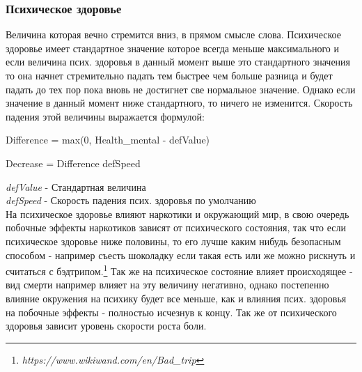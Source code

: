 \documentclass[11pt]{report}
\begin{document}
\subsubsection{Психическое здоровье}
Величина которая вечно стремится вниз, в прямом смысле слова. Психическое здоровье имеет стандартное значение которое всегда меньше максимального и если величина псих. здоровья в данный момент выше это стандартного значения то она начнет стремительно падать тем быстрее чем больше разница и будет падать до тех пор пока вновь не достигнет све нормальное значение. Однако если значение в данный момент ниже стандартного, то ничего не изменится. Скорость падения этой величины выражается формулой: 
\begin{myequation}
	Difference = max\left(0, Health_{mental} - defValue\right)
\end{myequation}
\begin{myequation}
	Decrease = Difference \cdot defSpeed
\end{myequation}
\textit{defValue} - Стандартная величина\\
\textit{defSpeed} - Скорость падения псих. здоровья по умолчанию\\

На психическое здоровье влияют наркотики и окружающий мир, в свою очередь побочные эффекты наркотиков зависят от психического состояния, так что если психическое здоровье ниже половины, то его лучше  каким нибудь безопасным способом - например съесть шоколадку если такая есть или же можно рискнуть и считаться с бэдтрипом.\footnote{\emph{https://www.wikiwand.com/en/Bad\_trip}} Так же на психическое состояние влияет происходящее - вид смерти например влияет на эту величину негативно, однако постепенно влияние окружения на психику будет все меньше, как и влияния псих. здоровья на побочные эффекты -  полностью исчезнув к концу. Так же от психического здоровья зависит уровень скорости роста боли.
\end{document}
